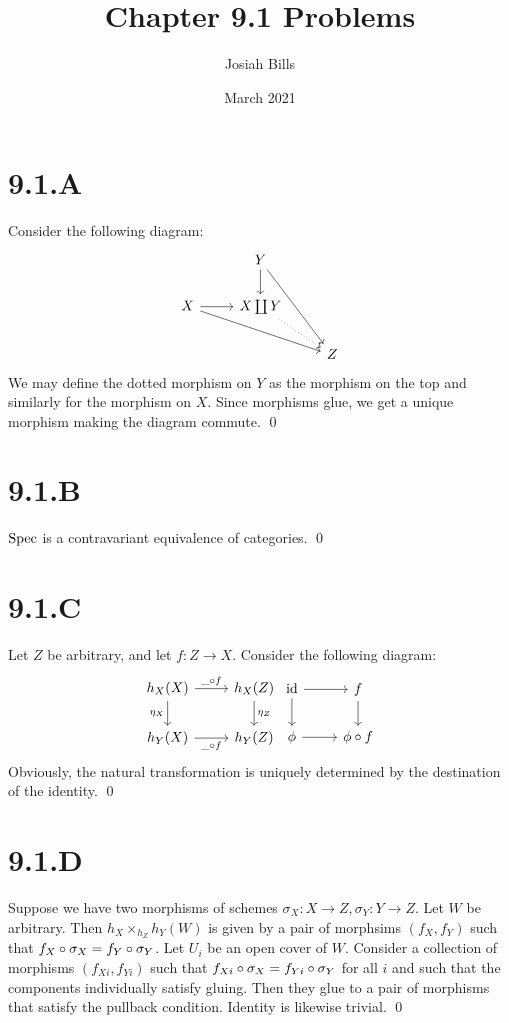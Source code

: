 \documentclass{article}
\title{Chapter 9.1 Problems}
\author{Josiah Bills}
\date{March 2021}
\begin{document}
\maketitle

\section{9.1.A}
Consider the following diagram: \[
    \begin{tikzcd}
        & Y \ar[d] \ar[ddr]
        \\
        X \ar[r] \ar[rrd] & X \coprod Y
        \ar[dr, dotted]                           \\
        &                   & Z
    \end{tikzcd}
\] We may define the dotted
morphism on $Y$ as the morphism on the top and similarly for
the morphism on $X$. Since morphisms glue, we get a unique
morphism making the diagram commute. \qed

\section{9.1.B}
$\operatorname{Spec}$ is a contravariant equivalence of categories. \qed

\section{9.1.C}
Let $Z$ be arbitrary, and let $f: Z \to X$.
Consider the following diagram: \[
    \begin{tikzcd}
        h_X(X) \ar[d, "\eta_X", swap] \ar[r, "\_ \after f"] & h_X(Z)
        \ar[d, "\eta_Z"]                                             \\
        h_Y(X) 	     \ar[r, "\_ \after f", swap]             & h_Y(Z)
    \end{tikzcd}
    \begin{tikzcd}
        \text{id} \ar[d] \ar[r] & f
        \ar[d]
        \\
        \phi		 \ar[r]             & \phi \after f
    \end{tikzcd}
\] Obviously, the natural
transformation is uniquely determined by the destination of the identity. \qed

\section{9.1.D}
Suppose we have two morphisms of schemes $\sigma_X: X \to Z, \sigma_Y: Y \to Z$. Let
$W$ be arbitrary. Then $h_X \times_{h_Z} h_Y(W)$ is given by
a pair of morphsims $(f_X, f_Y)$ such that $f_X \circ \sigma_X=f_Y \circ \sigma_Y$.
Let $U_i$ be an open cover of $W$.
Consider a collection of morphisms $(f_{Xi}, f_{Yi})$ such that
$f_{Xi} \circ \sigma_X=f_{Yi} \circ \sigma_Y$ for all $i$ and such that the
components individually satisfy gluing. Then they glue to a pair of morphisms
that satisfy the pullback condition. Identity is likewise trivial. \qed
\end{document}
